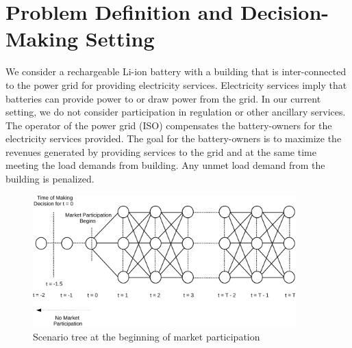 \documentclass[11pt,twoside]{article}
\begin{document}
\section{Problem Definition and Decision-Making Setting}\label{sec:setting}
We consider a rechargeable Li-ion battery with a building that is inter-connected to the power grid for providing electricity services. Electricity services imply that batteries can provide power to or draw power from the grid. In our current setting, we do not consider participation in regulation or other ancillary services. The operator of the power grid (ISO) compensates the battery-owners for the electricity services provided. The goal for the battery-owners is to maximize the revenues generated by providing services to the grid and at the same time meeting the load demands from building. Any unmet load demand from the building is penalized.\\
\begin{figure}[h!]
\begin{center}
\includegraphics[width=4in]{Figures/scenario_tree-crop.pdf} \caption{Scenario tree at the beginning of market participation}\label{scenario_tree}\end{center}
\end{figure}
\end{document}
